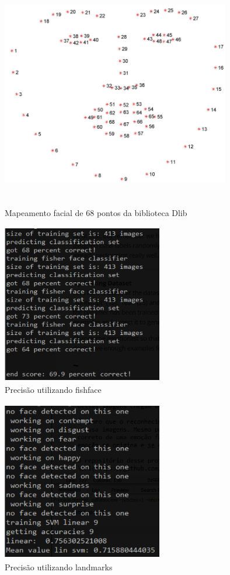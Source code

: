 \documentclass[a4paper, 12pt]{article}
\begin{document}
\begin{figure}[!ht]
	\centering
	\includegraphics[height=10cm, width=10cm]{facial_landmarks_68_markup.jpg}
	\caption{Mapeamento facial de 68 pontos da biblioteca Dlib}
	\label{fig:faceLandmarksDlib}
\end{figure}

\begin{figure}[!ht]
  \centering
  \includegraphics[height=7cm, width=7cm]{fishface.png}
  \caption{Precisão utilizando fishface}
  \label{fig:fishface}
\end{figure}

\begin{figure}[!ht]
  \centering
  \includegraphics[height=7cm, width=7cm]{landmarks.png}
  \caption{Precisão utilizando landmarks}
  \label{fig:landmarks}
\end{figure}
\end{document}
